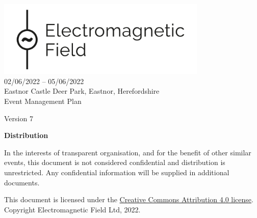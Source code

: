 

\newcommand{\st}{\textsuperscript{st} }
\newcommand{\nd}{\textsuperscript{nd} }
\renewcommand{\th}{\textsuperscript{th} }
\newcommand{\rd}{\textsuperscript{rd} }
\newcommand{\sq}{\textsuperscript{2}}




\begin{titlepage}
\thispagestyle{empty}
\begin{center}
    \includegraphics[width=10cm]{../resources/emf-logo.png}\\[24pt]
    {\LARGE 02/06/2022 -- 05/06/2022} \\[16pt]
    {\Large Eastnor Castle Deer Park, Eastnor, Herefordshire} \\[48pt]

    {\Large Event Management Plan}

    Version 7

    \vfill

    \begin{framed}
        \textbf{Distribution}

        In the interests of transparent organisation, and for the benefit of other similar events,
        this document is not considered confidential and distribution is unrestricted.
        Any confidential information will be supplied in additional documents.
        
        \footnotesize{This document is licensed under the
        \href{https://creativecommons.org/licenses/by/4.0/}{Creative Commons Attribution 4.0 license}.
	Copyright Electromagnetic Field Ltd, 2022.}
    \end{framed}


\end{center}
\end{titlepage}
